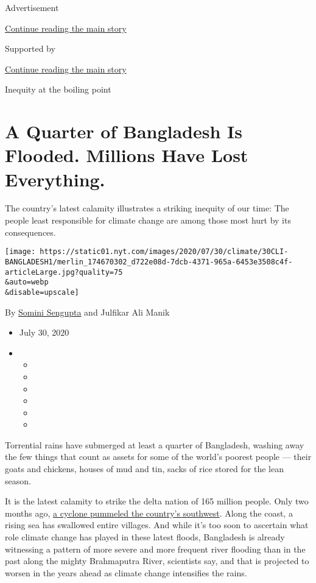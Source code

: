 Advertisement

\protect\hyperlink{after-top}{Continue reading the main story}

Supported by

\protect\hyperlink{after-sponsor}{Continue reading the main story}

Inequity at the boiling point

\hypertarget{a-quarter-of-bangladesh-is-flooded-millions-have-lost-everything}{%
\section{A Quarter of Bangladesh Is Flooded. Millions Have Lost
Everything.}\label{a-quarter-of-bangladesh-is-flooded-millions-have-lost-everything}}

The country's latest calamity illustrates a striking inequity of our
time: The people least responsible for climate change are among those
most hurt by its consequences.

\texttt{[image: https://static01.nyt.com/images/2020/07/30/climate/30CLI-BANGLADESH1/merlin\_174670302\_d722e08d-7dcb-4371-965a-6453e3508c4f-articleLarge.jpg?quality=75\\\&auto=webp\\\&disable=upscale]}

By \href{https://www.nytimes.com/by/somini-sengupta}{Somini Sengupta}
and Julfikar Ali Manik

\begin{itemize}
\item
  July 30, 2020
\item
  \begin{itemize}
  \item
  \item
  \item
  \item
  \item
  \item
  \end{itemize}
\end{itemize}

Torrential rains have submerged at least a quarter of Bangladesh,
washing away the few things that count as assets for some of the world's
poorest people --- their goats and chickens, houses of mud and tin,
sacks of rice stored for the lean season.

It is the latest calamity to strike the delta nation of 165 million
people. Only two months ago,
\href{https://www.nytimes.com/2020/05/20/world/asia/cyclone-amphan-india-bangladesh.html}{a
cyclone pummeled the country's southwest}. Along the coast, a rising sea
has swallowed entire villages. And while it's too soon to ascertain what
role climate change has played in these latest floods, Bangladesh is
already witnessing a pattern of more severe and more frequent river
flooding than in the past along the mighty Brahmaputra River, scientists
say, and that is projected to worsen in the years ahead as climate
change intensifies the rains.

